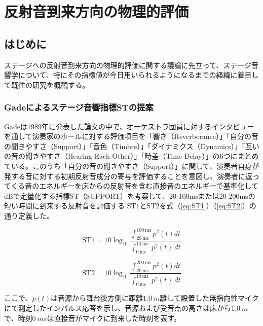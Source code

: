 \documentclass[11pt,a4j]{jreport}
\begin{document}
\chapter{反射音到来方向の物理的評価}


\section{はじめに}
ステージへの反射音到来方向の物理的評価に関する議論に先立って、ステージ音響学について、特にその指標値が今日用いられるようになるまでの経緯に着目して既往の研究を概観する。

\subsection{Gadeによるステージ音響指標STの提案}
Gadeは1989年に発表した論文\cite{Gade1989I}の中で、オーケストラ団員に対するインタビューを通して演奏家のホールに対する評価項目を「響き（Reverberance）」「自分の音の聞きやすさ（Support）」「音色（Timbre）」「ダイナミクス（Dynamics）」「互いの音の聞きやすさ（Hearing Each Other）」「時差（Time Delay）」の6つにまとめている。このうち「自分の音の聞きやすさ（Support）」に関して、演奏者自身が発する音に対する初期反射音成分の寄与を評価することを意図し、演奏者に返ってくる音のエネルギーを床からの反射音を含む直接音のエネルギーで基準化してdBで定量化する指標ST（SUPPORT）を考案して、20-100msまたは20-200msの短い時間に到来する反射音を評価する $\mathrm{ST1}$と$\mathrm{ST2}$を式（\ref{eq:ST1}）（\ref{eq:ST2}）の通り定義した。

\begin{equation}
  \label{eq:ST1}
  \mathrm{ST1}= 10 \log_{10}
  \frac{\int_{20 \: \mathrm{ms}}^{100 \: \mathrm{ms}} p^2(t) dt}
  {\int_{0 \: \mathrm{ms}}^{10 \: \mathrm{ms}} \: p^2(t) \: dt}
\end{equation}

\begin{equation}
  \label{eq:ST2}
  \mathrm{ST2}= 10 \log_{10}
  \frac{\int_{20 \: \mathrm{ms}}^{200 \: \mathrm{ms}} p^2(t) dt}
  {\int_{0 \: \mathrm{ms}}^{10 \: \mathrm{ms}} \: p^2(t) \: dt}
\end{equation}

\vspace{1\baselineskip}

ここで、$p(t)$は音源から舞台後方側に距離$\SI{1.0}{m}$離して設置した無指向性マイクにて測定したインパルス応答を示し、音源および受音点の高さは床から$\SI{1.0}{m}$で、時刻$\SI{0}{ms}$は直接音がマイクに到来した時刻を表す。
  
\end{document}
